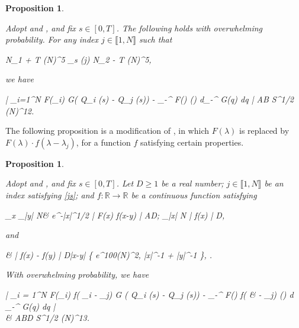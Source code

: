 \documentclass{amsart}
\numberwithin{equation}{section}
\newtheorem{prop}[thm]{Proposition}
\theoremstyle{remark}
\theoremstyle{definition}
\begin{document}
	
	\begin{prop}
		
		\label{concentrationh} 
		
		Adopt  and , and fix $s \in [0, T]$. The following holds with overwhelming probability. For any index $j \in \llbracket 1, N \rrbracket$ such that 
		\begin{flalign} 
			\label{js} 
			N_1 + T (\log N)^5 \le \varphi_s (j) \le N_2 - T (\log N)^5,
		\end{flalign} 
		
		\noindent we have 
		\begin{flalign}
			\label{lambdaqjs}
			\Bigg| \displaystyle\sum_{i=1}^N F(\lambda_i) \cdot G( Q_i (s) - Q_j (s))  - \displaystyle\int_{-\infty}^{\infty} F(\lambda) \varrho(\lambda) d\lambda  \displaystyle\int_{-\infty}^{\infty} G(\alpha q) dq \Bigg| \le AB S^{1/2} (\log N)^{12}.
		\end{flalign}
		
	\end{prop}
	
	The following proposition is a modification of , in which $F(\lambda)$ is replaced by $F(\lambda) \cdot f (\lambda - \lambda_j)$, for a function $f$ satisfying certain properties.
	
	
	\begin{prop}
		
		\label{concentrationh3} 
		
		Adopt  and , and fix $s \in [0, T]$. Let $D \ge 1$ be a real number; $j \in \llbracket 1, N \rrbracket$ be an index satisfying \eqref{js}; and $f:\mathbb{R} \rightarrow \mathbb{R}$ be a continuous function satisfying 
		\begin{flalign}
			\label{f1d} 
			\displaystyle\sup_{x \in {}} \displaystyle\sup_{|y| \le \log N}& e^{-|x|^{1/2}} \cdot | F(x) \cdot f(x-y) | \le AD; \qquad \displaystyle\sup_{|x|  \log N} | f(x) | \le D,
		\end{flalign} 
		
		\noindent and 
		\begin{flalign}
			\label{f2d}
			\begin{aligned}
			 & | f(x) - f(y) | \le D|x-y| \cdot \min \{  e^{100(\log N)^2}, |x|^{-1} + |y|^{-1} \}, \quad \text{if $x, y \in [-2 \log N, 2 \log N]$}. 
			 \end{aligned}
		\end{flalign}
		
		\noindent With overwhelming probability, we have
		\begin{flalign}
			\label{lambdaqjs3}
			\begin{aligned} 
				\Bigg| \displaystyle\sum_{i = 1}^N F(\lambda_i) \cdot f( \lambda_i - \lambda_j) \cdot G ( Q_i (s) - Q_j (s)) - \displaystyle\int_{-\infty}^{\infty} F(\lambda) f( & \lambda - \lambda_j) \varrho (\lambda) d \lambda  \displaystyle\int_{-\infty}^{\infty} G(\alpha q) dq \Bigg| \\
				& \qquad \le ABD S^{1/2} (\log N)^{13}.
			\end{aligned}
		\end{flalign}
		
	\end{prop} 
	
\end{document}
